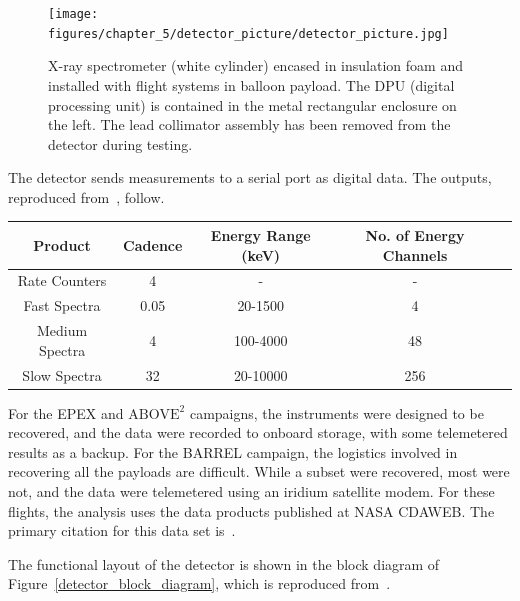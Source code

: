 \begin{figure}[p]
    \centering
    \texttt{[image: figures/chapter\_5/detector\_picture/detector\_picture.jpg]}
    \caption{X-ray spectrometer (white cylinder) encased in insulation foam and installed with flight systems in balloon payload. The DPU (digital processing unit) is contained in the metal rectangular enclosure on the left. The lead collimator assembly has been removed from the detector during testing.}
    \label{detector_picture}
\end{figure}

The detector sends measurements to a serial port as digital data. The outputs, reproduced from~\citet{Millan2014}, follow.

\begin{center}
\begin{tabular}{ |c|c|c|c|c| }
\hline
Product & Cadence & Energy Range (keV) & No. of Energy Channels \\
\hline
Rate Counters & 4 & - & - \\
Fast Spectra & 0.05 & 20-1500 & 4 \\
Medium Spectra & 4 & 100-4000 & 48 \\
Slow Spectra & 32 & 20-10000 & 256 \\
\hline
\end{tabular}
\end{center}

For the EPEX and $\text{ABOVE}^2$ campaigns, the instruments were designed to be recovered, and the data were recorded to onboard storage, with some telemetered results as a backup. For the BARREL campaign, the logistics involved in recovering all the payloads are difficult. While a subset were recovered, most were not, and the data were telemetered using an iridium satellite modem. For these flights, the analysis uses the data products published at NASA CDAWEB. The primary citation for this data set is~\citet{Millan2014}.

The functional layout of the detector is shown in the block diagram of Figure~\ref{detector_block_diagram}, which is reproduced from~\citet{Millan2014}.

